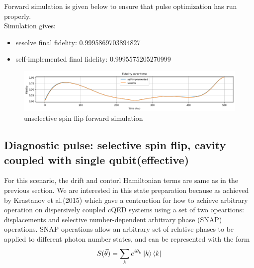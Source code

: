 \documentclass[12pt]{article}
\begin{document}
Forward simulation is given below to ensure that pulse optimization has run properly. 
\\
Simulation gives: 
\begin{itemize}
    \item sesolve final fidelity:  0.9995869703894827
    \item self-implemented final fidelity:  0.9995575205270999
\end{itemize}
\begin{figure}[H]
    \centering
    \includegraphics[width=0.95\linewidth]{unselective_spin_flip_simulation.png}
    \caption{unselective spin flip forward simulation}
    \label{fig:unselective_spin_flip_forward_simulation}
\end{figure}

\subsection{Diagnostic pulse: selective spin flip, cavity coupled with single qubit(effective)}

For this scenario, the drift and contorl Hamiltonian terms are same as in the previous section. We are interested in this state 
preparation because as achieved by Krastanov et al.(2015) \cite{Krastanov2015} which gave a contruction for how to achieve arbitrary 
operation on dispersively coupled cQED systems using a set of two opeartions: displacements and selective number-dependent arbitrary phase (SNAP) operations. 
SNAP operations allow an arbitrary set of relative phases to be applied to different photon number states, and can be represented with the form
\begin{equation}
    S(\vec{\theta}) = \sum_k e^{i\theta_k} \ket{k}\bra{k}
\end{equation}
\end{document}
